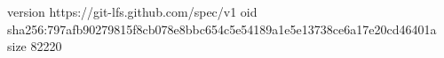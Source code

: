 version https://git-lfs.github.com/spec/v1
oid sha256:797afb90279815f8cb078e8bbc654c5e54189a1e5e13738ce6a17e20cd46401a
size 82220
